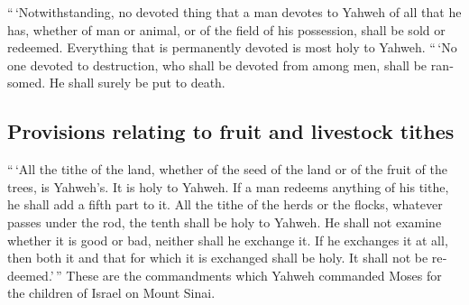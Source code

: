 \begin{paracol}{2}
\begin{otherlanguage}{english}
 ``\,`Notwithstanding, no devoted thing that a man
devotes to Yahweh of all that he has, whether of man or animal, or of
the field of his possession, shall be sold or redeemed. Everything that
is permanently devoted is most holy to Yahweh.  ``\,`No
one devoted to destruction, who shall be devoted from among men, shall
be ransomed. He shall surely be put to death.

\hypertarget{provisions-relating-to-fruit-and-livestock-tithes}{%
\subsection{Provisions relating to fruit and livestock
tithes}\label{provisions-relating-to-fruit-and-livestock-tithes}}

 ``\,`All the tithe of the land, whether of the seed of
the land or of the fruit of the trees, is Yahweh's. It is holy to
Yahweh.  If a man redeems anything of his tithe, he shall
add a fifth part to it.  All the tithe of the herds or
the flocks, whatever passes under the rod, the tenth shall be holy to
Yahweh.  He shall not examine whether it is good or bad,
neither shall he exchange it. If he exchanges it at all, then both it
and that for which it is exchanged shall be holy. It shall not be
redeemed.'\,''  These are the commandments which Yahweh
commanded Moses for the children of Israel on Mount Sinai.
\end{otherlanguage} \end{paracol}
